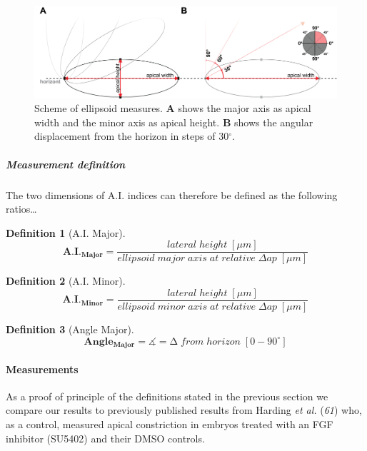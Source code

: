 \documentclass[11pt,singlespacinge,twoside]{reedthesis} %
\theoremstyle{definition}
\newtheorem{definition}{Definition}[chapter]
\theoremstyle{definition}
\theoremstyle{definition}
\theoremstyle{remark}
\begin{document}
\begin{figure}[H]

{\centering \includegraphics[width=0.75\linewidth]{figures/materials/models/ellipse} 

}

\caption[Scheme of ellipsoid measures]{Scheme of ellipsoid measures. \textbf{A} shows the major axis as apical width and the minor axis as apical height. \textbf{B} shows the angular displacement from the horizon in steps of 30\(^\circ\).}\label{fig:ellipse}
\end{figure}
\hypertarget{aci-theorem}{%
\subparagraph{Measurement definition}\label{aci-theorem}}

The two dimensions of A.I. indices can therefore be defined as the following ratios\ldots{}
\begin{definition}[A.I. Major]
\protect\hypertarget{def:unnamed-chunk-6}{}{\label{def:unnamed-chunk-6} {} }\[\mathbf{A.I._{Major}} = \frac{lateral\;height\;[\mu m]}{ellipsoid\;major\;axis\;at\;relative\;\Delta ap\;[\mu m]}\]
\end{definition}
\begin{definition}[A.I. Minor]
\protect\hypertarget{def:unnamed-chunk-7}{}{\label{def:unnamed-chunk-7} {} }\[\mathbf{A.I._{Minor}} = \frac{lateral\;height\;[\mu m]}{ellipsoid\;minor\;axis\;at\;relative\;\Delta ap\;[\mu m]}\]
\end{definition}
\begin{definition}[Angle Major]
\protect\hypertarget{def:unnamed-chunk-8}{}{\label{def:unnamed-chunk-8} {} }\[\mathbf{Angle_{Major}} = \measuredangle = \mathrm{\Delta}\;from\;horizon\;[0-90^\circ]\]
\end{definition}
\hypertarget{ACI-Dis}{%
\paragraph{Measurements}\label{ACI-Dis}}

As a proof of principle of the definitions stated in the previous section we compare our results to previously published results from Harding \emph{et al.} (\emph{61}) who, as a control, measured apical constriction in embryos treated with an FGF inhibitor (SU5402) and their DMSO controls.
\end{document}
